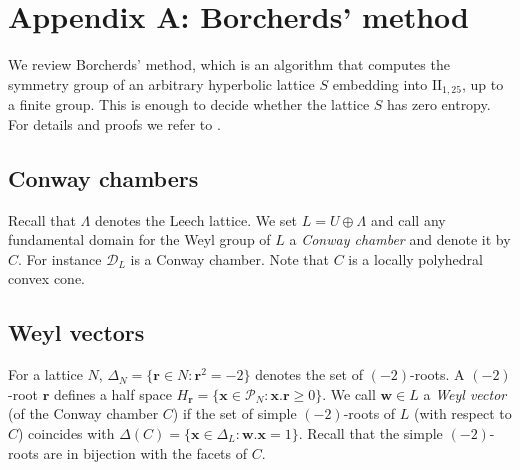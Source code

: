 \documentclass[11pt,letterpaper]{amsart}
\newcommand{\vect}[1]{\boldsymbol{#1}}
\begin{document}



\section{Appendix A: Borcherds' method} \label{sec:borcherds.method}
We review Borcherds' method, which is an algorithm that computes the symmetry group of an arbitrary hyperbolic lattice $S$ embedding into $\mathrm{II}_{1,25}$, up to a finite group. This is enough to decide whether the lattice $S$ has zero entropy. For details and proofs we refer to \cite{shimada.borcherds}.

\subsection{Conway chambers}
Recall that $\Lambda$ denotes the Leech lattice. We set $L = U \oplus \Lambda$ and call any fundamental domain for the Weyl group of $L$ a \emph{Conway chamber} and denote it by $C$. For instance $\mathcal{D}_L$ is a Conway chamber. Note that $C$ is a locally polyhedral convex cone. 

\subsection{Weyl vectors}
For a lattice $N$, $\Delta_N = \{\vect{r} \in N : \vect{r}^2 = -2\}$ denotes the set of $(-2)$-roots. A $(-2)$-root $\vect{r}$ defines a half space $H_{\vect{r}}=\{\vect{x} \in \mathcal{P}_N  : \vect{x}.\vect{r}\geq 0\}$.
We call $\vect{w} \in L$ a \emph{Weyl vector} (of the Conway chamber $C$) if the set of simple $(-2)$-roots of $L$ (with respect to $C$) coincides with $\Delta(C) = \{\vect{x} \in \Delta_L : \vect{w}.\vect{x} = 1\}$.
Recall that the simple $(-2)$-roots are in bijection with the facets of $C$.
\end{document}
